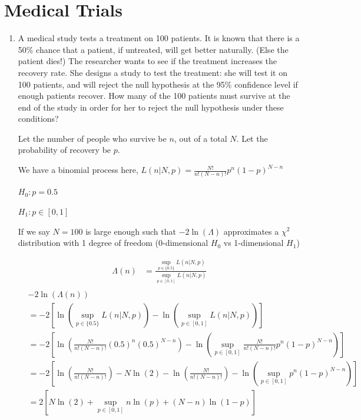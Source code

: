 \section{Medical Trials}

\begin{enumerate}[label=\textbf{\Alph*}.]
    \item A medical study tests a treatment on 100 patients. It is known that there is a 50\% chance that a patient, if untreated, will get better naturally. (Else the patient dies!) The researcher wants to see if the treatment increases the recovery rate. She designs a study to test the treatment: she will test it on 100 patients, and will reject the null hypothesis at the 95\% confidence level if enough patients recover. How many of the 100 patients must survive at the end of the study in order for her to reject the null hypothesis under these conditions?

    Let the number of people who survive be $n$, out of a total $N$. Let the probability of recovery be $p$.

    We have a binomial process here, $L(n|N,p) = \frac{N!}{n!(N-n)!}p^{n}(1-p)^{N-n}$


    $H_0: p=0.5$

    $H_1: p \in [0,1]$

    If we say $N=100$ is large enough such that $-2\ln(\Lambda)$ approximates a $\chi^2$ distribution with 1 degree of freedom (0-dimensional $H_0$ vs 1-dimensional $H_1$) 

    \begin{align*}
        \Lambda(n) &= \frac{\sup_{p \in \{0.5\}} L(n|N,p) }{\sup_{p \in [0,1]} L(n|N,p)} \\
    \end{align*}
    \begin{align*}
        &-2\ln(\Lambda(n)) \\
        &= -2\left[\ln\left(\sup_{p \in \{0.5\}} L(n|N,p)\right) - \ln\left(\sup_{p \in [0,1]} L(n|N,p)\right)\right] \\
        &= -2\left[\ln\left(\frac{N!}{n!(N-n)!}(0.5)^{n}(0.5)^{N-n}\right) - \ln\left(\sup_{p \in [0,1]} \frac{N!}{n!(N-n)!}p^{n}(1-p)^{N-n}\right)\right] \\
        &= -2\left[\ln\left(\frac{N!}{n!(N-n)!}\right) - N\ln(2) - \ln\left(\frac{N!}{n!(N-n)!}\right) - \ln\left(\sup_{p \in [0,1]} p^{n}(1-p)^{N-n}\right)\right] \\
        &= 2\left[N\ln(2) + \sup_{p \in [0,1]} n\ln(p) + (N-n)\ln(1-p)\right] \\
    \end{align*}


\end{enumerate}
